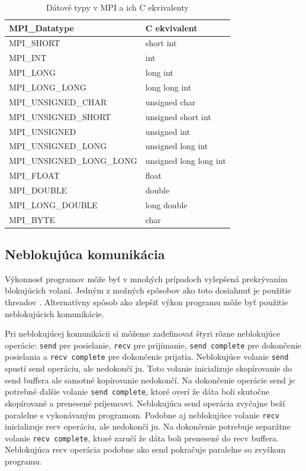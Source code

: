 \begin{table}[!h]
\centering
\begin{tabular}{@{}ll@{}}
\toprule
\textbf{MPI\_Datatype}    & \textbf{C ekvivalent}  \\ \midrule
MPI\_SHORT                & short int              \\
MPI\_INT                  & int                    \\
MPI\_LONG                 & long int               \\
MPI\_LONG\_LONG           & long long int          \\
MPI\_UNSIGNED\_CHAR       & unsigned char          \\
MPI\_UNSIGNED\_SHORT      & unsigned short int     \\
MPI\_UNSIGNED             & unsigned int           \\
MPI\_UNSIGNED\_LONG       & unsigned long int      \\
MPI\_UNSIGNED\_LONG\_LONG & unsigned long long int \\
MPI\_FLOAT                & float                  \\
MPI\_DOUBLE               & double                 \\
MPI\_LONG\_DOUBLE         & long double            \\
MPI\_BYTE                 & char                   \\ \bottomrule
\end{tabular}
\caption{Dátové typy v MPI a ich C ekvivalenty}
\label{tab:mpi-datatypes}
\end{table}

\subsection{Neblokujúca komunikácia}
Výkonnosť programov môže byť v mnohých prípadoch vylepšená prekrývaním blokujúcich volaní.
Jedným z možných spôsobov ako toto dosiahnuť je použitie threadov \cite{mpi3-1}.
Alternatívny spôsob ako zlepšiť výkon programu môže byť použitie neblokujúcich komunikácie.

Pri neblokujúcej komunikácii si môžeme zadefinovať štyri rôzne neblokujúce operácie: \texttt{send} pre posielanie,
\texttt{recv} pre prijímanie, \texttt{send complete} pre dokončenie posielania a \texttt{recv complete} pre dokončenie prijatia.
Neblokujúce volanie \texttt{send} spustí send operáciu, ale nedokončí ju.
Toto volanie inicializuje skopírovanie do send buffera ale samotné kopírovanie nedokončí.
Na dokončenie operácie send je potrebné ďalšie volanie \texttt{send complete},
ktoré overí že dáta boli skutočne skopírované a prenesené príjemcovi.
Neblokujúca send operácia zvyčajne beží paralelne s vykonávaným programom.
Podobne aj neblokujúce volanie \texttt{recv} inicializuje recv operáciu, ale nedokončí ju. Na dokončenie potrebuje separátne volanie \texttt{recv complete},
ktoré zaručí že dáta boli prenesené do recv buffera. Neblokujúca recv operácia podobne ako send pokračuje paralelne so zvyškom programu.

